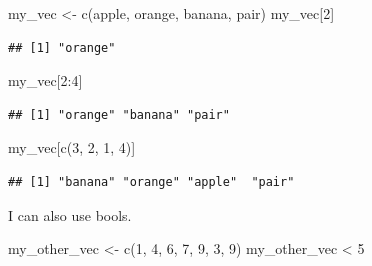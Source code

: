 \documentclass[
]{book}
\newenvironment{Shaded}{\begin{snugshade}}{\end{snugshade}}
\newcommand{\DecValTok}[1]{\textcolor[rgb]{0.00,0.00,0.81}{#1}}
\newcommand{\FunctionTok}[1]{\textcolor[rgb]{0.00,0.00,0.00}{#1}}
\newcommand{\NormalTok}[1]{#1}
\newcommand{\OtherTok}[1]{\textcolor[rgb]{0.56,0.35,0.01}{#1}}
\newcommand{\SpecialCharTok}[1]{\textcolor[rgb]{0.00,0.00,0.00}{#1}}
\newcommand{\StringTok}[1]{\textcolor[rgb]{0.31,0.60,0.02}{#1}}
\begin{document}
\begin{Shaded}
\begin{Highlighting}[]
\NormalTok{my\_vec }\OtherTok{\textless{}{-}} \FunctionTok{c}\NormalTok{(}\StringTok{\textquotesingle{}apple\textquotesingle{}}\NormalTok{, }\StringTok{\textquotesingle{}orange\textquotesingle{}}\NormalTok{, }\StringTok{\textquotesingle{}banana\textquotesingle{}}\NormalTok{, }\StringTok{\textquotesingle{}pair\textquotesingle{}}\NormalTok{)}
\NormalTok{my\_vec[}\DecValTok{2}\NormalTok{]}
\end{Highlighting}
\end{Shaded}

\begin{verbatim}
## [1] "orange"
\end{verbatim}

\begin{Shaded}
\begin{Highlighting}[]
\NormalTok{my\_vec[}\DecValTok{2}\SpecialCharTok{:}\DecValTok{4}\NormalTok{]}
\end{Highlighting}
\end{Shaded}

\begin{verbatim}
## [1] "orange" "banana" "pair"
\end{verbatim}

\begin{Shaded}
\begin{Highlighting}[]
\NormalTok{my\_vec[}\FunctionTok{c}\NormalTok{(}\DecValTok{3}\NormalTok{, }\DecValTok{2}\NormalTok{, }\DecValTok{1}\NormalTok{, }\DecValTok{4}\NormalTok{)]}
\end{Highlighting}
\end{Shaded}

\begin{verbatim}
## [1] "banana" "orange" "apple"  "pair"
\end{verbatim}

I can also use bools.

\begin{Shaded}
\begin{Highlighting}[]
\NormalTok{my\_other\_vec }\OtherTok{\textless{}{-}} \FunctionTok{c}\NormalTok{(}\DecValTok{1}\NormalTok{, }\DecValTok{4}\NormalTok{, }\DecValTok{6}\NormalTok{, }\DecValTok{7}\NormalTok{, }\DecValTok{9}\NormalTok{, }\DecValTok{3}\NormalTok{, }\DecValTok{9}\NormalTok{)}
\NormalTok{my\_other\_vec }\SpecialCharTok{\textless{}} \DecValTok{5}
\end{Highlighting}
\end{Shaded}
\end{document}
